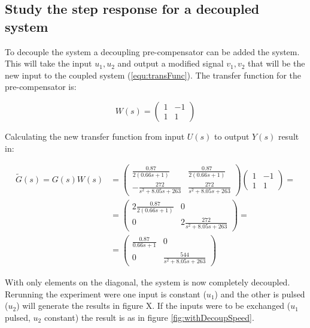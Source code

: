 \documentclass[a4paper, titlepage]{article}
\begin{document}
\subsection{Study the step response for a decoupled system}
To decouple the system a decoupling pre-compensator can be added the system.
This will take the input $u_1, u_2$ and output a modified signal $v_1, v_2$ that will be the new input to the coupled system (\ref{equ:transFunc}).
The transfer function for the pre-compensator is:

\begin{equation}
W(s) = 
\begin{pmatrix}
1 & -1 \\ 1 & 1
\end{pmatrix}
\end{equation}

Calculating the new transfer function from input $U(s)$ to output $Y(s)$ result in:

\begin{equation}
\begin{split}
\tilde{G}(s) = G(s)W(s) &= 
\begin{pmatrix}
\frac{0.87}{2(0.66s + 1)} & \frac{0.87}{2(0.66s + 1)} \\[6pt]
-\frac{272}{s^2 + 8.05s + 263} & \frac{272}{s^2 + 8.05s + 263}
\end{pmatrix}
\begin{pmatrix}
1 & -1 \\ 1 & 1
\end{pmatrix} = \\
&= \begin{pmatrix}
2\frac{0.87}{2(0.66s + 1)} & 0 \\[6pt]
0 & 2\frac{272}{s^2 + 8.05s + 263}
\end{pmatrix} = \\
&= \begin{pmatrix}
\frac{0.87}{0.66s + 1} & 0 \\[6pt]
0 & \frac{544}{s^2 + 8.05s + 263}
\end{pmatrix}
\end{split}
\label{equ:decoupled}
\end{equation}

With only elements on the diagonal, the system is now completely decoupled.
Rerunning the experiment were one input is constant ($u_1$) and the other is pulsed ($u_2$) will generate the results in figure X.
If the inputs were to be exchanged ($u_1$ pulsed, $u_2$ constant) the result is as in figure \ref{fig:withDecoupSpeed}.
\end{document}
